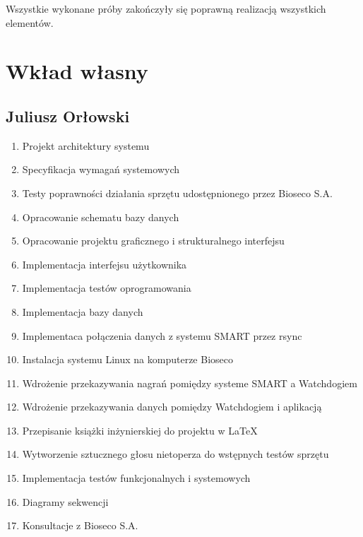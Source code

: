 \documentclass{sprz}
\begin{document}
Wszystkie wykonane próby zakończyły się poprawną realizacją wszystkich elementów.

\chapter{Wkład własny}

\section{Juliusz Orłowski}

\begin{enumerate}
  \item Projekt architektury systemu
  \item Specyfikacja wymagań systemowych
  \item Testy poprawności działania sprzętu udostępnionego przez Bioseco S.A.
  \item Opracowanie schematu bazy danych
  \item Opracowanie projektu graficznego i strukturalnego interfejsu
  \item Implementacja interfejsu użytkownika
  \item Implementacja testów oprogramowania
  \item Implementacja bazy danych
  \item Implementaca połączenia danych z systemu SMART przez rsync
  \item Instalacja systemu Linux na komputerze Bioseco
  \item Wdrożenie przekazywania nagrań pomiędzy systeme SMART a Watchdogiem
  \item Wdrożenie przekazywania danych pomiędzy Watchdogiem i aplikacją
  \item Przepisanie książki inżynierskiej do projektu w LaTeX
  \item Wytworzenie sztucznego głosu nietoperza do wstępnych testów sprzętu
  \item Implementacja testów funkcjonalnych i systemowych
  \item Diagramy sekwencji
  \item Konsultacje z Bioseco S.A.
\end{enumerate}
\end{document}
